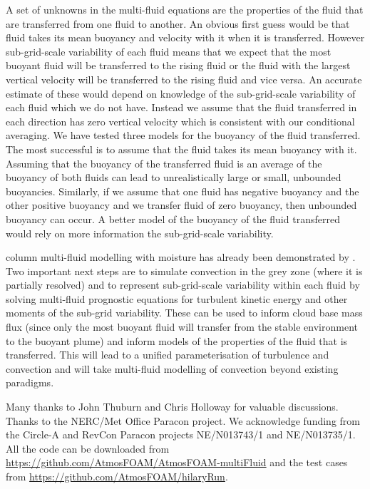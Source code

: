 \documentclass[draft]{agujournal2019}
\begin{document}
A set of unknowns in the multi-fluid equations are the properties
of the fluid that are transferred from one fluid to another. An obvious
first guess would be that fluid takes its mean buoyancy and velocity
with it when it is transferred. However sub-grid-scale variability
of each fluid means that we expect that the most buoyant fluid will
be transferred to the rising fluid or the fluid with the largest vertical
velocity will be transferred to the rising fluid and vice versa. An
accurate estimate of these would depend on knowledge of the sub-grid-scale
variability of each fluid which we do not have. Instead we assume
that the fluid transferred in each direction has zero vertical velocity
which is consistent with our conditional averaging. We have tested
three models for the buoyancy of the fluid transferred. The most successful
is to assume that the fluid takes its mean buoyancy with it. Assuming
that the buoyancy of the transferred fluid is an average of the buoyancy
of both fluids can lead to unrealistically large or small, unbounded
buoyancies. Similarly, if we assume that one fluid has negative buoyancy
and the other positive buoyancy and we transfer fluid of zero buoyancy,
then unbounded buoyancy can occur. A better model of the buoyancy
of the fluid transferred would rely on more information the sub-grid-scale
variability.

 column multi-fluid modelling with moisture has already been
demonstrated by  
.
Two important next steps are to simulate
convection in the grey zone (where it is partially resolved) and to
represent sub-grid-scale variability within each fluid by solving
multi-fluid prognostic equations for turbulent kinetic energy and
other moments of the sub-grid variability. These can be used to inform
cloud base mass flux (since only the most buoyant fluid will transfer
from the stable environment to the buoyant plume) and inform models
of the properties of the fluid that is transferred. This will lead
to a unified parameterisation of turbulence and convection and will
take multi-fluid modelling of convection beyond existing paradigms. 

\acknowledgments

Many thanks to John Thuburn and Chris Holloway for valuable discussions.
Thanks to the NERC/Met Office Paracon project. We acknowledge funding
from the Circle-A and RevCon Paracon projects NE/N013743/1 and NE/N013735/1. All the code can be downloaded from \url{https://github.com/AtmosFOAM/AtmosFOAM-multiFluid} and the test cases from \url{https://github.com/AtmosFOAM/hilaryRun}.


\end{document}
